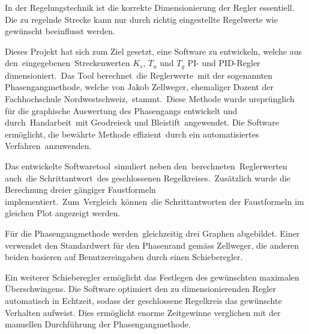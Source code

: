 In  der   Regelungstechnik  ist   die  korrekte  Dimensionierung   der  Regler
essentiell. Die  zu  regelnde  Strecke  kann nur  durch  richtig  eingestellte
Regelwerte wie gew\"unscht beeinflusst werden. 
 

Dieses  Projekt  hat sich  zum  Ziel  gesetzt,  eine Software  zu  entwickeln,
welche  aus   den eingegebenen Streckenwerten  $K_s$,  $T_u$  und   $T_g$  PI-
und  PID-Regler  dimensioniert. Das  Tool  berechnet die  Reglerwerte mit  der
sogenannten   Phasengangmethode,  welche   von  Jakob   Zellweger,  ehemaliger
Dozent   der  Fachhochschule   Nordwestschweiz, stammt. Diese  Methode   wurde
urspr\"unglich  f\"ur die  graphische  Auswertung  des Phasengangs  entwickelt
und  durch Handarbeit mit  Geodreieck und  Bleistift angewendet. Die  Software
erm\"oglicht,  die  bew\"ahrte  Methode  effizient durch  ein  automatisiertes
Verfahren anzuwenden.
 

Das  entwickelte   Softwaretool simuliert  neben  den berechneten Reglerwerten
auch die    Schrittantwort des     geschlossenen    Regelkreises. Zus\"atzlich
wurde      die       Berechnung      dreier       g\"angiger      Faustformeln
implementiert. Zum Vergleich k\"onnen die Schrittantworten der Faustformeln im
gleichen Plot angezeigt werden.


F\"ur die Phasengangmethode werden gleichzeitig drei Graphen abgebildet. Einer
verwendet  den  Standardwert  f\"ur  den Phasenrand  gem\"ass  Zellweger,  die
anderen beiden basieren auf Benutzereingaben durch einen Schieberegler.


Ein  weiterer  Schieberegler  erm\"oglicht  das  Festlegen  des  gew\"unschten
maximalen  \"Uberschwingens. Die Software  optimiert den  zu dimensionierenden
Regler  automatisch  in  Echtzeit,  sodass  der  geschlossene  Regelkreis  das
gew\"unschte   Verhalten   aufweist. Dies  erm\"oglicht   enorme   Zeitgewinne
verglichen mit der manuellen Durchf\"uhrung der Phasengangmethode.
